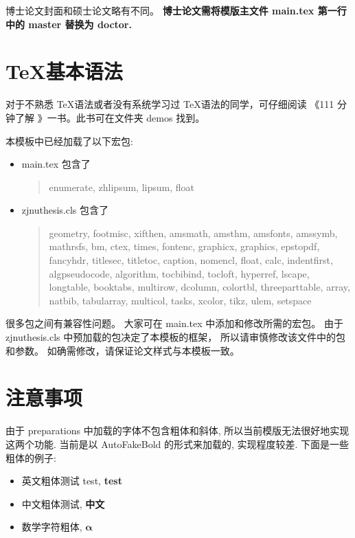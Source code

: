 \documentclass[twoside,doctor]{zjnuthesis}
\begin{document}
博士论文封面和硕士论文略有不同。
\textbf{博士论文需将模版主文件 main.tex 第一行中的 master 替换为 doctor.}

\section{\TeX 基本语法}

对于不熟悉 \TeX 语法或者没有系统学习过 \TeX 语法的同学，可仔细阅读
《111 分钟了解 \LaTeXe》一书。此书可在文件夹 demos 找到。

本模板中已经加载了以下宏包:
\begin{itemize}
\item main.tex 包含了
  \begin{quote}
    enumerate, zhlipsum, lipsum, float
  \end{quote}
  
\item zjnuthesis.cls 包含了
  \begin{quote}
    \begin{flushleft}
      geometry, footmisc, xifthen, amsmath, amsthm, amsfonts, amssymb, mathrsfs, bm, ctex,
      times, fontenc, graphicx, graphics, epstopdf, fancyhdr, titlesec, titletoc,
      caption, nomencl, float, calc, indentfirst, algpseudocode, algorithm, tocbibind, tocloft,
      hyperref, lscape, longtable, booktabs, multirow, dcolumn, colortbl, threeparttable,
      array, natbib, tabularray, multicol, tasks, xcolor, tikz, ulem, setspace
    \end{flushleft}
  \end{quote}
\end{itemize}
很多包之间有兼容性问题。
大家可在 main.tex 中添加和修改所需的宏包。
由于 zjnuthesis.cls 中预加载的包决定了本模板的框架，
所以请审慎修改该文件中的包和参数。
如确需修改，请保证论文样式与本模板一致。

\section{注意事项}

由于 preparations 中加载的字体不包含粗体和斜体,
所以当前模版无法很好地实现这两个功能.
当前是以 AutoFakeBold 的形式来加载的, 实现程度较差. 下面是一些粗体的例子:

\begin{itemize}
\item 英文粗体测试 test, \textbf{test}

\item 中文粗体测试, \textbf{中文}

\item 数学字符粗体, \(\bm{\alpha}\)
\end{itemize}
\end{document}
